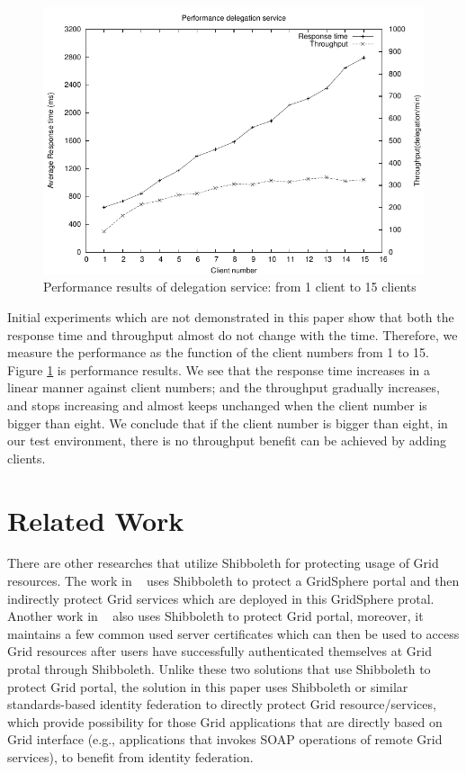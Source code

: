 \documentclass[conference]{IEEEtran}
\begin{document}
\begin{figure}
\includegraphics[width=0.9\columnwidth]{Delegation_thread_to_perf.pdf}
\caption{Performance results of delegation service: from 1 client to 15 clients}
\label{fig:Deleg}
\end{figure}

Initial experiments which are not demonstrated in this paper show that both the response time and
throughput almost do not change with the time. Therefore, we measure the performance as the function 
of the client numbers from 1 to 15. Figure \ref{fig:Deleg} is performance results. We see that 
the response time increases in a linear manner against client numbers; and the throughput gradually 
increases, and stops increasing and almost keeps unchanged when the client number is bigger than eight.
We conclude that if the client number is bigger than eight, in our test environment, there is no 
throughput benefit can be achieved by adding clients.


\section{Related Work}
\label{sec:relatedwork}
There are other researches that utilize Shibboleth for protecting usage of Grid resources. 
The work in ~\cite{J.Watt06} uses Shibboleth to protect a GridSphere portal and then 
indirectly protect Grid services which are deployed in this GridSphere protal. Another 
work in ~\cite{R.O.Sinnott06} also uses Shibboleth to protect Grid portal, moreover, it 
maintains a few common used server certificates which can then be used to access Grid 
resources after users have successfully authenticated themselves at Grid protal through
Shibboleth. Unlike these two solutions that use Shibboleth to protect Grid portal, the solution
in this paper uses Shibboleth or similar standards-based identity federation to directly protect 
Grid resource/services, which provide possibility for those Grid applications that are directly
based on Grid interface (e.g., applications that invokes SOAP operations of remote Grid services),
to benefit from identity federation.
\end{document}
